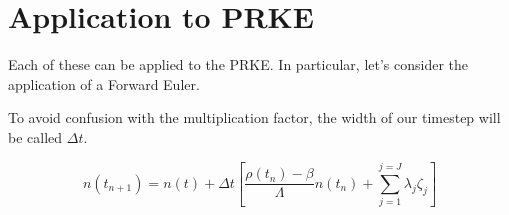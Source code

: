 \documentclass[12pt]{article}
\begin{document}
\section{Application to PRKE}

Each of these can be applied to the PRKE. In particular, let's consider the 
application of a Forward Euler.

To avoid confusion with the multiplication factor, the width of our timestep will be called $\Delta t$.

\begin{equation}
n(t_{n+1}) = n(t) + \Delta t\left[\frac{\rho(t_n)-\beta}{\Lambda}n(t_n) + \displaystyle\sum^{j=J}_{j=1}\lambda_j\zeta_j\right]
\end{equation}
\end{document}
